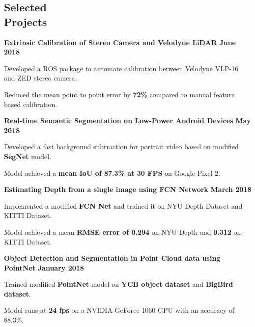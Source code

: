 \documentclass[letterpaper, margin, line, 10.5pt]{resume}
\begin{document}
\begin{resume}
    
	\sectionseperator
	\section{\myheadingstyle Selected \\ Projects}
	\textbf{Extrinsic Calibration of Stereo Camera and Velodyne LiDAR} \hfill \textbf{June 2018}
	\begin{list2}
		\item Developed a ROS package to automate calibration between Velodyne VLP-16 and ZED stereo camera.
		\item Reduced the mean point to point error by \textbf{72\%} compared to manual feature based calibration.
	\end{list2}\vspace{-3.2mm}
	
	\textbf{Real-time Semantic Segmentation on Low-Power Android Devices} \hfill \textbf{May 2018}
	\begin{list2}
		\item Developed a fast background subtraction for portrait video based on modified \textbf{SegNet} model.
		\item Model achieved a \textbf{mean IoU of 87.3\% at 30 FPS} on Google Pixel 2.
	\end{list2}\vspace{-3.2mm}

	\textbf{Estimating Depth from a single image using FCN Network} \hfill \textbf{March 2018}
	\begin{list2}
		\item Implemented a modified \textbf{FCN Net} and trained it on NYU Depth Dataset and KITTI Dataset.
		\item Model achieved a mean \textbf{RMSE error of 0.294} on NYU Depth and \textbf{0.312} on KITTI Dataset.
	\end{list2}\vspace{-3.2mm}

	\textbf{Object Detection and Segmentation in Point Cloud data using PointNet} \hfill \textbf{January 2018}
	\begin{list2}
		\item Trained modified \textbf{PointNet} model on \textbf{YCB object dataset} and \textbf{BigBird dataset}.
		\item Model runs at \textbf{24 fps} on a NVIDIA GeForce 1060 GPU with an accuracy of 88.3\%.
	\end{list2}\vspace{-3.2mm}


\end{resume}
\end{document}
